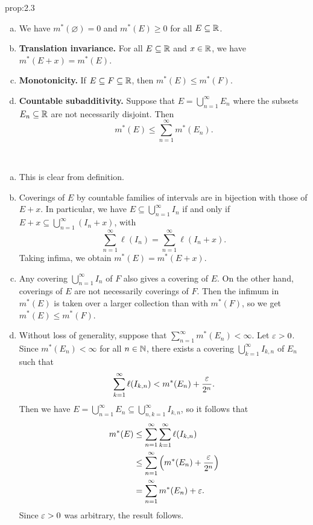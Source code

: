 \begin{prop}{prop:2.3}
    \begin{enumerate}[(a)]
        \item We have $m^*(\varnothing) = 0$ and $m^*(E) \geq 0$ 
        for all $E \subseteq \mathbb{R}$. 
        \item {\bf Translation invariance.} For all $E \subseteq \mathbb{R}$ and 
        $x \in \mathbb{R}$, we have $m^*(E+x) = m^*(E)$. 
        \item {\bf Monotonicity.} If $E \subseteq F \subseteq \mathbb{R}$, then 
        $m^*(E) \leq m^*(F)$. 
        \item {\bf Countable subadditivity.} Suppose that $E = 
        \bigcup_{n=1}^\infty E_n$ where the subsets $E_n \subseteq \mathbb{R}$ are not 
        necessarily disjoint. Then 
        \[ m^*(E) \leq \sum_{n=1}^\infty m^*(E_n). \] 
    \end{enumerate}
\end{prop}
\begin{pf}~
    \begin{enumerate}[(a)]
        \item This is clear from definition. 
        \item Coverings of $E$ by countable families of intervals are in 
        bijection with those of $E + x$. In particular, we have 
        $E \subseteq \bigcup_{n=1}^\infty I_n$ if and only if 
        $E + x \subseteq \bigcup_{n=1}^\infty (I_n + x)$, with 
        \[ \sum_{n=1}^\infty \ell(I_n) = \sum_{n=1}^\infty \ell(I_n + x). \] 
        Taking infima, we obtain $m^*(E) = m^*(E + x)$. 
        \item Any covering $\bigcup_{n=1}^\infty I_n$ of $F$ also gives a 
        covering of $E$. On the other hand, coverings of $E$ are not 
        necessarily coverings of $F$. Then the infimum in $m^*(E)$ is 
        taken over a larger collection than with $m^*(F)$, so we get 
        $m^*(E) \leq m^*(F)$. 
        \item Without loss of generality, suppose that $\sum_{n=1}^\infty 
        m^*(E_n) < \infty$. Let $\varepsilon > 0$. Since $m^*(E_n) < \infty$ 
        for all $n \in \mathbb{N}$, there exists a covering $\bigcup_{k=1}^\infty 
        I_{k,n}$ of $E_n$ such that 
        \[ \sum_{k=1}^\infty \ell(I_{k,n}) < m^*(E_n) + \frac{\varepsilon}{2^n}. \] 
        Then we have $E = \bigcup_{n=1}^\infty E_n \subseteq 
        \bigcup_{n,k=1}^\infty I_{k,n}$, so it follows that 
        \begin{align*}
            m^*(E) &\leq \sum_{n=1}^\infty \sum_{k=1}^\infty \ell(I_{k,n}) \\ 
            &\leq \sum_{n=1}^\infty \left( m^*(E_n) + \frac{\varepsilon}{2^n} \right) \\
            &= \sum_{n=1}^\infty m^*(E_n) + \varepsilon. 
        \end{align*}
        Since $\varepsilon > 0$ was arbitrary, the result follows. \qedhere 
    \end{enumerate}
\end{pf}

